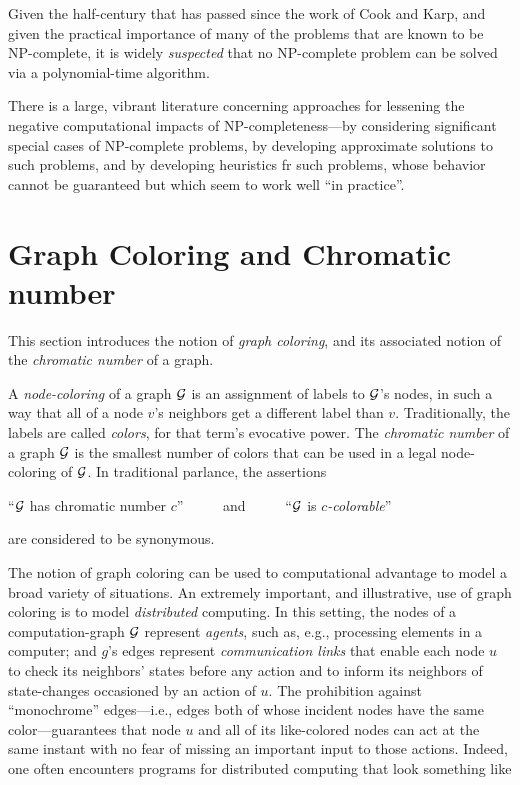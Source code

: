 Given the half-century that has passed since the work of Cook and
Karp, and given the practical importance of many of the problems that
are known to be {\sf NP}-complete, it is widely {\em suspected} that
no {\sf NP}-complete problem can be solved via a polynomial-time
algorithm.

There is a large, vibrant literature concerning approaches for
lessening the negative computational impacts of {\sf
  NP}-completeness---by considering significant special cases of {\sf
  NP}-complete problems, by developing approximate solutions to such
problems, and by developing heuristics fr such problems, whose
behavior cannot be guaranteed but which seem to work well ``in
practice''.


\section{Graph Coloring and Chromatic number}
\label{sec:graph-color}

This section introduces the notion of {\it graph coloring}, and its
associated notion of the {\it chromatic number}
 of a graph.

A {\it node-coloring}  of a graph $\mbox{$\cal G$}$ is
an assignment of labels to $\mbox{$\cal G$}$'s nodes, in such a way that all of a
node $v$'s neighbors get a different label than $v$.  Traditionally,
the labels are called {\it colors}, for that term's evocative power.
The {\it chromatic number}  of a graph
$\mbox{$\cal G$}$ is the smallest number of colors that can be used in a legal
node-coloring of $\mbox{$\cal G$}$.  In traditional parlance, the assertions

``$\mbox{$\cal G$}$ has chromatic number $c$'' \ \ \ \ \ and \ \ \ \ \
``$\mbox{$\cal G$}$ is {\it $c$-colorable}''

\noindent
are considered to be synonymous.

The notion of graph coloring can be used to computational advantage to
model a broad variety of situations.  An extremely important, and
illustrative, use of graph coloring is to model {\it distributed}
computing.  In this setting, the nodes of a computation-graph $\mbox{$\cal G$}$
represent {\it agents}, such as, e.g., processing elements in a
computer; and $g$'s edges represent {\it communication links} that
enable each node $u$ to check its neighbors' states before any action
and to inform its neighbors of state-changes occasioned by an action
of $u$.  The prohibition against ``monochrome'' edges---i.e., edges
both of whose incident nodes have the same color---guarantees that
node $u$ and all of its like-colored nodes can act at the same instant
with no fear of missing an important input to those actions.  Indeed,
one often encounters programs for distributed computing that look
something like

